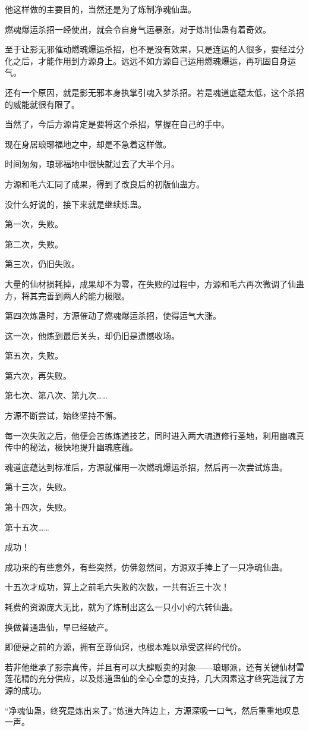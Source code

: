 \begin{this_body}
他这样做的主要目的，当然还是为了炼制净魂仙蛊。

燃魂爆运杀招一经使出，就会令自身气运暴涨，对于炼制仙蛊有着奇效。

至于让影无邪催动燃魂爆运杀招，也不是没有效果，只是连运的人很多，要经过分化之后，才能作用到方源身上。远远不如方源自己运用燃魂爆运，再巩固自身运气。

还有一个原因，就是影无邪本身执掌引魂入梦杀招。若是魂道底蕴太低，这个杀招的威能就很有限了。

当然了，今后方源肯定是要将这个杀招，掌握在自己的手中。

现在身居琅琊福地之中，却是不急着这样做。

时间匆匆，琅琊福地中很快就过去了大半个月。

方源和毛六汇同了成果，得到了改良后的初版仙蛊方。

没什么好说的，接下来就是继续炼蛊。

第一次，失败。

第二次，失败。

第三次，仍旧失败。

大量的仙材损耗掉，成果却不为零，在失败的过程中，方源和毛六再次微调了仙蛊方，将其完善到两人的能力极限。

第四次炼蛊时，方源催动了燃魂爆运杀招，使得运气大涨。

这一次，他炼到最后关头，却仍旧是遗憾收场。

第五次，失败。

第六次，再失败。

第七次、第八次、第九次……

方源不断尝试，始终坚持不懈。

每一次失败之后，他便会苦练炼道技艺，同时进入两大魂道修行圣地，利用幽魂真传中的秘法，极快地提升幽魂底蕴。

魂道底蕴达到标准后，方源就催用一次燃魂爆运杀招，然后再一次尝试炼蛊。

第十三次，失败。

第十四次，失败。

第十五次……

成功！

成功来的有些意外，有些突然，仿佛忽然间，方源双手捧上了一只净魂仙蛊。

十五次才成功，算上之前毛六失败的次数，一共有近三十次！

耗费的资源庞大无比，就为了炼制出这么一只小小的六转仙蛊。

换做普通蛊仙，早已经破产。

即便是之前的方源，拥有至尊仙窍，也根本难以承受这样的代价。

若非他继承了影宗真传，并且有可以大肆贩卖的对象——琅琊派，还有关键仙材雪莲花精的充分供应，以及炼道蛊仙的全心全意的支持，几大因素这才终究造就了方源的成功。

“净魂仙蛊，终究是炼出来了。”炼道大阵边上，方源深吸一口气，然后重重地叹息一声。

\end{this_body}

